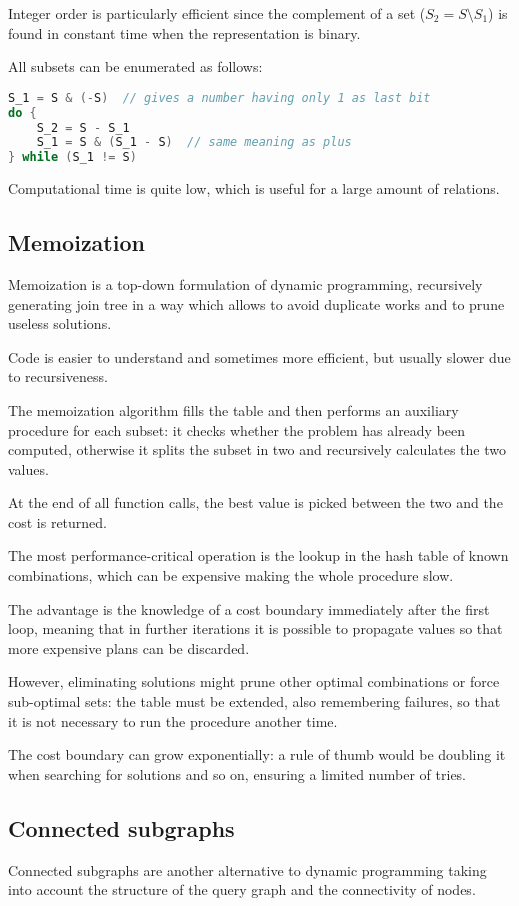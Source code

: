 Integer order is particularly efficient since the complement of a set ($S_2 = S \setminus S_1$) is found in constant time when the representation is binary.

All subsets can be enumerated as follows:
\begin{lstlisting}[language=C++]
S_1 = S & (-S)  // gives a number having only 1 as last bit
do {
	S_2 = S - S_1
	S_1 = S & (S_1 - S)  // same meaning as plus
} while (S_1 != S)
\end{lstlisting}
Computational time is quite low, which is useful for a large amount of relations.

\subsection{Memoization}
Memoization is a top-down formulation of dynamic programming, recursively generating join tree in a way which allows to avoid duplicate works and to prune useless solutions.

Code is easier to understand and sometimes more efficient, but usually slower due to recursiveness.

The memoization algorithm fills the table and then performs an auxiliary procedure for each subset: it checks whether the problem has already been computed, otherwise it splits the subset in two and recursively calculates the two values.

At the end of all function calls, the best value is picked between the two and the cost is returned. 

The most performance-critical operation is the lookup in the hash table of known combinations, which can be expensive making the whole procedure slow.

The advantage is the knowledge of a cost boundary immediately after the first loop, meaning that in further iterations it is possible to propagate values so that more expensive plans can be discarded.

However, eliminating solutions might prune other optimal combinations or force sub-optimal sets: the table must be extended, also remembering failures, so that it is not necessary to run the procedure another time.

The cost boundary can grow exponentially: a rule of thumb would be doubling it when searching for solutions and so on, ensuring a limited number of tries. 

\subsection{Connected subgraphs}
Connected subgraphs are another alternative to dynamic programming taking into account the structure of the query graph and the connectivity of nodes.

